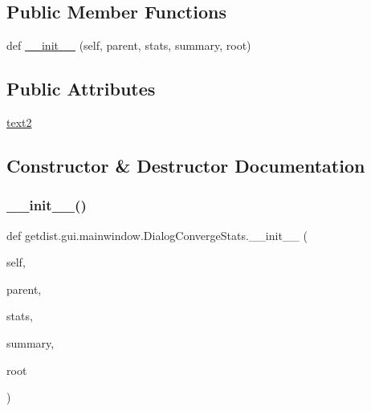 \subsection*{Public Member Functions}
\begin{DoxyCompactItemize}
\item 
def \mbox{\hyperlink{classgetdist_1_1gui_1_1mainwindow_1_1DialogConvergeStats_a1ec4da6f78ed4a2b8a887c9bccaaefa6}{\+\_\+\+\_\+init\+\_\+\+\_\+}} (self, parent, stats, summary, root)
\end{DoxyCompactItemize}
\subsection*{Public Attributes}
\begin{DoxyCompactItemize}
\item 
\mbox{\hyperlink{classgetdist_1_1gui_1_1mainwindow_1_1DialogConvergeStats_a9214266356d19a7e42190d89da4bf341}{text2}}
\end{DoxyCompactItemize}


\subsection{Constructor \& Destructor Documentation}
\mbox{\label{classgetdist_1_1gui_1_1mainwindow_1_1DialogConvergeStats_a1ec4da6f78ed4a2b8a887c9bccaaefa6}} 
\subsubsection{\texorpdfstring{\+\_\+\+\_\+init\+\_\+\+\_\+()}{\_\_init\_\_()}}
{\footnotesize\ttfamily def getdist.\+gui.\+mainwindow.\+Dialog\+Converge\+Stats.\+\_\+\+\_\+init\+\_\+\+\_\+ (\begin{DoxyParamCaption}\item[{}]{self,  }\item[{}]{parent,  }\item[{}]{stats,  }\item[{}]{summary,  }\item[{}]{root }\end{DoxyParamCaption})}



